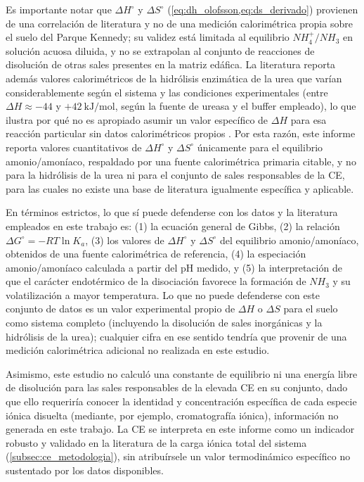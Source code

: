 \documentclass[fleqn]{jaes}
\begin{document}
Es importante notar que $\Delta H^\circ$ y $\Delta S^\circ$ (\cref{eq:dh_olofsson,eq:ds_derivado}) provienen de una correlación de literatura y no de una medición calorimétrica propia sobre el suelo del Parque Kennedy; su validez está limitada al equilibrio $NH_4^+/NH_3$ en solución acuosa diluida, y no se extrapolan al conjunto de reacciones de disolución de otras sales presentes en la matriz edáfica. La literatura reporta además valores calorimétricos de la hidrólisis enzimática de la urea que varían considerablemente según el sistema y las condiciones experimentales (entre $\Delta H \approx -44$ y $+42~\text{kJ/mol}$, según la fuente de ureasa y el buffer empleado), lo que ilustra por qué no es apropiado asumir un valor específico de $\Delta H$ para esa reacción particular sin datos calorimétricos propios \cite{Jiang2018}. Por esta razón, este informe reporta valores cuantitativos de $\Delta H^\circ$ y $\Delta S^\circ$ únicamente para el equilibrio amonio/amoníaco, respaldado por una fuente calorimétrica primaria citable, y no para la hidrólisis de la urea ni para el conjunto de sales responsables de la CE, para las cuales no existe una base de literatura igualmente específica y aplicable.

En términos estrictos, lo que sí puede defenderse con los datos y la literatura empleados en este trabajo es: (1) la ecuación general de Gibbs, (2) la relación $\Delta G^\circ = -RT\ln K_a$, (3) los valores de $\Delta H^\circ$ y $\Delta S^\circ$ del equilibrio amonio/amoníaco, obtenidos de una fuente calorimétrica de referencia, (4) la especiación amonio/amoníaco calculada a partir del pH medido, y (5) la interpretación de que el carácter endotérmico de la disociación favorece la formación de $NH_3$ y su volatilización a mayor temperatura. Lo que no puede defenderse con este conjunto de datos es un valor experimental propio de $\Delta H$ o $\Delta S$ para el suelo como sistema completo (incluyendo la disolución de sales inorgánicas y la hidrólisis de la urea); cualquier cifra en ese sentido tendría que provenir de una medición calorimétrica adicional no realizada en este estudio.

Asimismo, este estudio no calculó una constante de equilibrio ni una energía libre de disolución para las sales responsables de la elevada CE en su conjunto, dado que ello requeriría conocer la identidad y concentración específica de cada especie iónica disuelta (mediante, por ejemplo, cromatografía iónica), información no generada en este trabajo. La CE se interpreta en este informe como un indicador robusto y validado en la literatura de la carga iónica total del sistema (\cref{subsec:ce_metodologia}), sin atribuírsele un valor termodinámico específico no sustentado por los datos disponibles.
\end{document}
